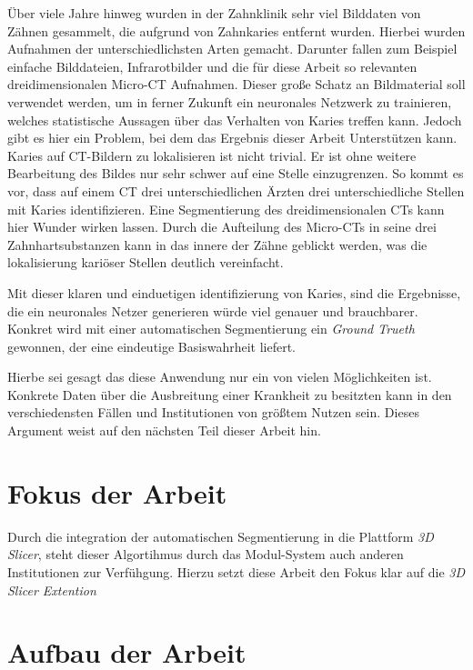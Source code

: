 Über viele Jahre hinweg wurden in der Zahnklinik sehr viel Bilddaten von Zähnen gesammelt,
die aufgrund von Zahnkaries entfernt wurden. Hierbei wurden Aufnahmen der unterschiedlichsten
Arten gemacht. Darunter fallen zum Beispiel einfache Bilddateien, Infrarotbilder
und die für diese Arbeit so relevanten dreidimensionalen Micro-CT Aufnahmen.
Dieser große Schatz an Bildmaterial soll verwendet werden, um in ferner Zukunft ein
neuronales Netzwerk zu trainieren, welches statistische Aussagen über das
Verhalten von Karies treffen kann. Jedoch gibt es hier ein Problem, bei dem das
Ergebnis dieser Arbeit Unterstützen kann. Karies auf CT-Bildern zu lokalisieren ist
nicht trivial. Er ist ohne weitere Bearbeitung des Bildes nur sehr schwer auf
eine Stelle einzugrenzen. So kommt es vor, dass auf einem CT drei
unterschiedlichen Ärzten drei unterschiedliche Stellen mit Karies identifizieren.
Eine Segmentierung des dreidimensionalen CTs kann hier Wunder wirken lassen.
Durch die Aufteilung des Micro-CTs in seine drei Zahnhartsubstanzen kann in das
innere der Zähne geblickt werden, was die lokalisierung kariöser Stellen deutlich
vereinfacht.

Mit dieser klaren und einduetigen identifizierung von Karies, sind die
Ergebnisse, die ein neuronales Netzer generieren würde viel genauer und brauchbarer.
Konkret wird mit einer automatischen Segmentierung ein \textit{Ground Trueth} gewonnen,
der eine eindeutige Basiswahrheit liefert.

Hierbe sei gesagt das diese Anwendung nur ein von vielen Möglichkeiten ist. Konkrete
Daten über die Ausbreitung einer Krankheit zu besitzten kann in den verschiedensten
Fällen und Institutionen von größtem Nutzen sein. Dieses Argument weist auf den
nächsten Teil dieser Arbeit hin.

\section{Fokus der Arbeit}
\label{sec:fokus_der-arbeit} Durch die integration der automatischen
Segmentierung in die Plattform \textit{3D Slicer}, steht dieser Algortihmus
durch das Modul-System auch anderen Institutionen zur Verfühgung. Hierzu setzt diese
Arbeit den Fokus klar auf die \textit{3D Slicer Extention}

\section{Aufbau der Arbeit}
\label{sec:aufbau_der_arbeit}